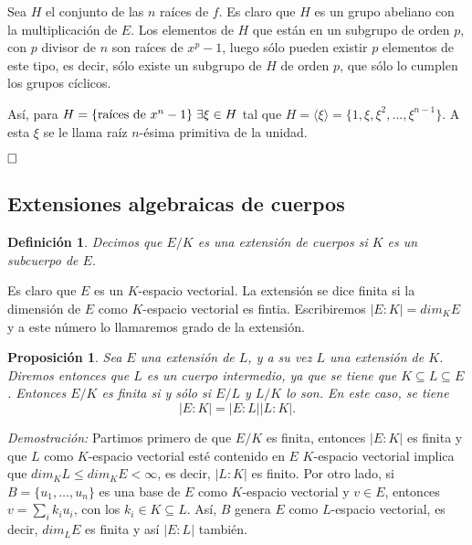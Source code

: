 \documentclass[12pt]{article}
\newtheorem{proposition}[theorem]{Proposición}
\newtheorem{definition}[theorem]{Definición}
\begin{document}
Sea $H$ el conjunto de las $n$ raíces de $f$. Es claro que $H$ es un grupo abeliano con la multiplicación de $E$. Los elementos de $H$ que están en un subgrupo de orden $p$, con $p$ divisor de $n$ son raíces de $x^p-1$, luego sólo pueden existir $p$ elementos de este tipo, es decir, sólo existe un subgrupo de $H$ de orden $p$, que sólo lo cumplen los grupos cíclicos. 

Así, para $H = \lbrace \text{raíces de $x^n-1$} \rbrace \hspace{0.1cm} \exists \xi \in H$ tal que $H = \langle \xi \rangle = \lbrace 1, \xi, \xi^2, \ldots, \xi^{n-1} \rbrace$. A esta $\xi$ se le llama raíz $n$-ésima primitiva de la unidad.

$\hfill \square$

\subsection{Extensiones algebraicas de cuerpos}

\begin{definition}Decimos que $E/K$ es una extensión de cuerpos si $K$ es un subcuerpo de $E$.
\end{definition}

Es claro que $E$ es un $K$-espacio vectorial. La extensión se dice finita si la dimensión de $E$ como $K$-espacio vectorial es fintia. Escribiremos $|E:K| = dim_K E$ y a este número lo llamaremos grado de la extensión.

\begin{proposition} \label{eq:trgr} Sea $E$ una extensión de $L$, y a su vez $L$ una extensión de $K$. Diremos entonces que $L$ es un cuerpo intermedio, ya que se tiene que $K \subseteq L \subseteq E$. Entonces $E/K$ es finita si y sólo si $E/L$ y $L/K$ lo son. En este caso, se tiene $$|E: K| = |E:L| |L:K|.$$
\end{proposition}
\emph{Demostración: } Partimos primero de que $E/K$ es finita, entonces $|E:K|$ es finita y que $L$ como $K$-espacio vectorial esté contenido en $E$ $K$-espacio vectorial implica que $dim_{K} L \leq dim_{K} E < \infty$, es decir, $|L:K|$ es finito. Por otro lado, si $B = \lbrace u_{1}, \ldots, u_{n}\rbrace$ es una base de $E$ como $K$-espacio vectorial y $v \in E$, entonces $v = \sum_{i} k_{i}u_{i}$, con los $k_{i} \in K \subseteq L$. Así, $B$ genera $E$ como $L$-espacio vectorial, es decir, $dim_{L}E$ es finita y así $|E:L|$ también.
\end{document}
